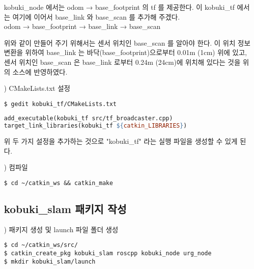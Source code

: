 kobuki\_node 에서는 odom → base\_footprint 의 tf 를 제공한다. 이 kobuki\_tf 에서는 여기에 이어서 base\_link 와 base\_scan 를 추가해 주겠다.\\

odom → base\_footprint  → base\_link → base\_scan

위와 같이 만들어 주기 위해서는 센서 위치인 base\_scan 를 알아야 한다. 이 위치 정보 변환을 위하여 base\_link 는 바닥(base\_footprint)으로부터 0.01m (1cm) 위에 있고, 센서 위치인 base\_scan 은 base\_link 로부터 0.24m (24cm)에 위치해 있다는 것을 위의 소스에 반영하였다.

\vspace{\baselineskip}
\noindent
{}
\thenum) CMakeLists.txt 설정

\vspace{\baselineskip}
\begin{lstlisting}[language=ROS]
$ gedit kobuki_tf/CMakeLists.txt 
\end{lstlisting}


\vspace{\baselineskip}
\begin{lstlisting}[language=make]
add_executable(kobuki_tf src/tf_broadcaster.cpp)
target_link_libraries(kobuki_tf ${catkin_LIBRARIES})
\end{lstlisting}


위 두 가지 설정을 추가하는 것으로 "kobuki\_tf" 라는 실행 파일을 생성할 수 있게 된다.

\vspace{\baselineskip}
\noindent
{}
\thenum) 컴파일

\vspace{\baselineskip}
\begin{lstlisting}[language=ROS]
$ cd ~/catkin_ws && catkin_make
\end{lstlisting}



\subsection{kobuki\_slam 패키지 작성}

\setcounter{num}{0}

\vspace{\baselineskip}
\noindent
{}
\thenum) 패키지 생성 및 launch 파일 폴더 생성

\vspace{\baselineskip}
\begin{lstlisting}[language=ROS]
$ cd ~/catkin_ws/src/
$ catkin_create_pkg kobuki_slam roscpp kobuki_node urg_node
$ mkdir kobuki_slam/launch
\end{lstlisting}


